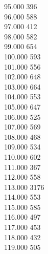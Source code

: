{ 95.000	396 \\
 96.000	588 \\
 97.000	412 \\
 98.000	582 \\
 99.000	654 \\
 100.000	593 \\
 101.000	556 \\
 102.000	648 \\
 103.000	664 \\
 104.000	553 \\
 105.000	647 \\
 106.000	525 \\
 107.000	569 \\
 108.000	468 \\
 109.000	534 \\
 110.000	602 \\
 111.000	367 \\
 112.000	558 \\
 113.000	3176 \\
 114.000	553 \\
 115.000	585 \\
 116.000	497 \\
 117.000	453 \\
 118.000	432 \\
 119.000	505 \\
}
